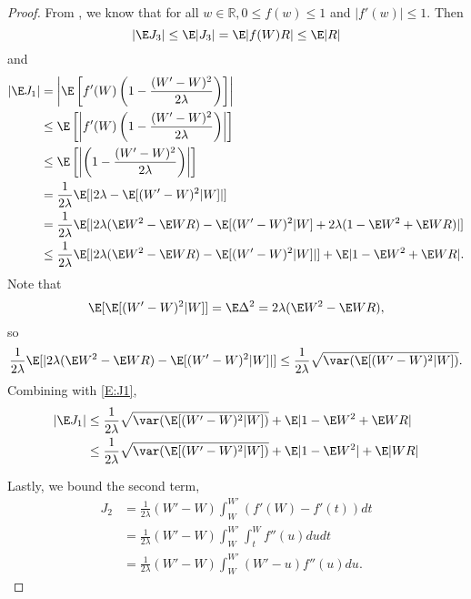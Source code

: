 \begin{proof}
  From \cite{chen2004normal}, we know that for all $w \in \mathbb{R}, 0 \leq f(w) \leq 1$ and
  $|f'(w)| \leq 1$.  Then
  \begin{equation}
    |\E J_3| \leq \E |J_3| = \E |f(W)R| \leq \E |R|
  \end{equation}
  and
  \begin{equation}
    \label{E:J1}
    \begin{split}
      |\E J_1 | &= \left | \E \left [f'(W)\left (1-\frac{(W'-W)^2}{2\lambda} \right ) \right ]
      \right | \\
      &\leq \E \left [\left | f'(W)\left (1-\frac{(W'-W)^2}{2\lambda} \right ) \right | \right ] \\
      &\leq \E \left [ \left | \left (1-\frac{(W'-W)^2}{2\lambda} \right )  \right | \right ] \\
      &= \frac{1}{2\lambda} \E [|2\lambda - \E [(W'-W)^2|W]|] \\
      &= \frac{1}{2\lambda} \E [|2\lambda (\E W^2 - \E WR) - \E [(W'-W)^2|W] +
      2\lambda (1 - \E W^2 + \E WR)|] \\
      &\leq \frac{1}{2\lambda} \E [|2\lambda (\E W^2 - \E WR) - \E [(W'-W)^2|W]|] +
      \E |1 - \E W^2 + \E WR|.
    \end{split}
  \end{equation}
  Note that
  \begin{equation}
    \E [\E [(W'-W)^2|W]] = \E \Delta^2 = 2 \lambda (\E W^2 - \E WR),
  \end{equation}
  so
  \begin{equation}
    \frac{1}{2\lambda} \E [|2\lambda (\E W^2 - \E WR) - \E [(W'-W)^2|W]|] \leq
    \frac{1}{2\lambda} \sqrt{\var (\E [(W'-W)^2|W])}.
  \end{equation}
  Combining with \eqref{E:J1},
  \begin{equation}
    \begin{split}
      |\E J_1 | &\leq \frac{1}{2\lambda} \sqrt{\var (\E [(W'-W)^2|W])} +
      \E |1 - \E W^2 + \E WR| \\
      &\leq \frac{1}{2\lambda} \sqrt{\var (\E [(W'-W)^2|W])} + \E |1 - \E W^2| + \E |WR| \\
    \end{split}
  \end{equation}

  Lastly, we bound the second term,
  \begin{equation}
    \begin{split}
      J_2 &= \frac{1}{2 \lambda}(W'-W)\int_W^{W'} (f'(W)-f'(t)) dt \\
      &= \frac{1}{2 \lambda}(W'-W)\int_W^{W'}\int_t^Wf''(u) du dt \\
      &= \frac{1}{2 \lambda}(W'-W)\int_W^{W'} (W'-u)f''(u) du.
    \end{split}
  \end{equation}


\end{proof}
